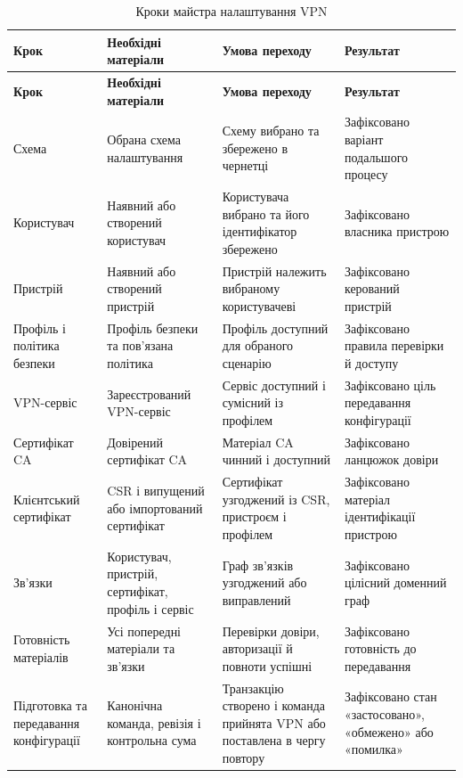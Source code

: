\documentclass{article}
\begin{document}
\begin{longtable}{p{2.6cm}p{4.0cm}p{4.2cm}p{3.0cm}}
\caption{Кроки майстра налаштування VPN}\label{tab:wizard-steps}\\
\toprule
\textbf{Крок} & \textbf{Необхідні матеріали} & \textbf{Умова переходу} & \textbf{Результат} \\
\midrule
\endfirsthead
\toprule
\textbf{Крок} & \textbf{Необхідні матеріали} & \textbf{Умова переходу} & \textbf{Результат} \\
\midrule
\endhead
Схема & Обрана схема налаштування & Схему вибрано та збережено в чернетці & Зафіксовано варіант подальшого процесу \\
Користувач & Наявний або створений користувач & Користувача вибрано та його ідентифікатор збережено & Зафіксовано власника пристрою \\
Пристрій & Наявний або створений пристрій & Пристрій належить вибраному користувачеві & Зафіксовано керований пристрій \\
Профіль і політика безпеки & Профіль безпеки та пов'язана політика & Профіль доступний для обраного сценарію & Зафіксовано правила перевірки й доступу \\
VPN-сервіс & Зареєстрований VPN-сервіс & Сервіс доступний і сумісний із профілем & Зафіксовано ціль передавання конфігурації \\
Сертифікат CA & Довірений сертифікат CA & Матеріал CA чинний і доступний & Зафіксовано ланцюжок довіри \\
Клієнтський сертифікат & CSR і випущений або імпортований сертифікат & Сертифікат узгоджений із CSR, пристроєм і профілем & Зафіксовано матеріал ідентифікації пристрою \\
Зв'язки & Користувач, пристрій, сертифікат, профіль і сервіс & Граф зв'язків узгоджений або виправлений & Зафіксовано цілісний доменний граф \\
Готовність матеріалів & Усі попередні матеріали та зв'язки & Перевірки довіри, авторизації й повноти успішні & Зафіксовано готовність до передавання \\
Підготовка та передавання конфігурації & Канонічна команда, ревізія і контрольна сума & Транзакцію створено і команда прийнята VPN або поставлена в чергу повтору & Зафіксовано стан «застосовано», «обмежено» або «помилка» \\
\bottomrule
\end{longtable}
\end{document}
